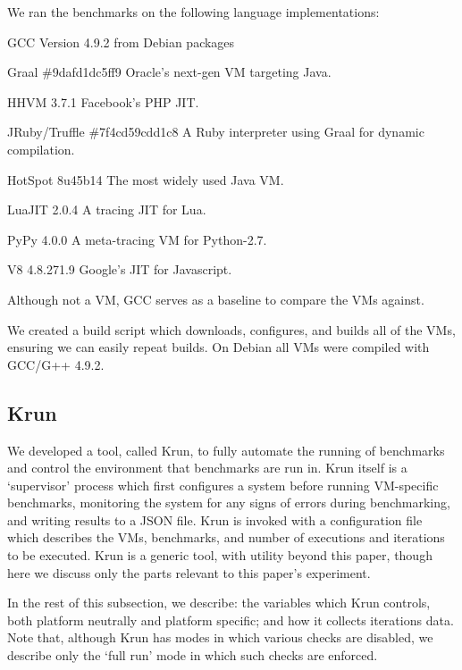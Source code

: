 \documentclass[a4paper,UKenglish]{lipics}
\newcommand{\krun}{Krun\xspace}
\begin{document}
We ran the benchmarks on the following language implementations:
\begin{description*}
\item[GCC] Version 4.9.2 from Debian packages
\item[Graal \#9dafd1dc5ff9] Oracle's next-gen VM targeting Java.
\item[HHVM 3.7.1] Facebook's PHP JIT.
\item[JRuby/Truffle \#7f4cd59cdd1c8] A Ruby interpreter using Graal for dynamic compilation.
\item[HotSpot 8u45b14] The most widely used Java VM.
\item[LuaJIT 2.0.4] A tracing JIT for Lua.
\item[PyPy 4.0.0] A meta-tracing VM for Python-2.7.
\item[V8 4.8.271.9] Google's JIT for Javascript.
\end{description*}
%
Although not a VM, GCC serves as a baseline to compare the VMs against.

We created a build script which downloads, configures, and builds all of the
VMs, ensuring we can easily repeat builds.
On Debian all VMs were compiled with GCC/G++ 4.9.2.


\subsection{\krun}

We developed a tool, called \krun, to fully automate the running of benchmarks
and control the environment that benchmarks are run in. \krun itself is a
`supervisor' process which first configures a system before running VM-specific
benchmarks, monitoring the system for any signs of errors during benchmarking,
and writing results to a JSON file. \krun is invoked with a configuration file
which describes the VMs, benchmarks, and number of executions and iterations to
be executed. \krun is a generic tool, with utility beyond this paper, though
here we discuss only the parts relevant to this paper's experiment. 

In the rest
of this subsection, we describe: the variables which \krun controls, both
platform neutrally and platform specific; and how it collects iterations data.
Note that, although \krun has modes in which various checks are disabled, we
describe only the `full run' mode in which such checks are enforced.
\end{document}
